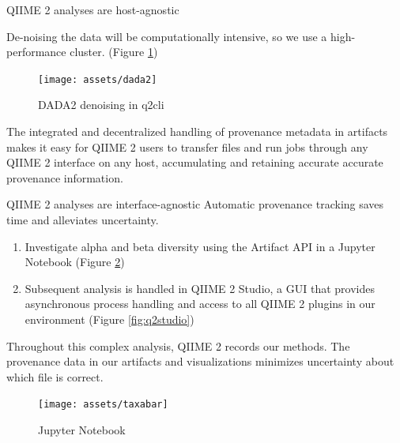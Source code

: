 \documentclass[final]{beamer}
\newlength{\colwidth}
\begin{document}
\begin{frame}[t]
\begin{columns}[t]
\begin{column}{\colwidth}
  \begin{block}{QIIME 2 analyses are host-agnostic}

    De-noising the data will be computationally intensive, so we use a
    high-performance cluster. (Figure \ref{fig:dada2})

    \begin{figure}[tph!]
      {\texttt{[image: assets/dada2]}}
      \caption{DADA2 denoising in q2cli}
      \label{fig:dada2}
    \end{figure}

    \begin{tcolorbox}
    [width=\textwidth, colframe=blue]
    {The integrated and decentralized handling of provenance metadata in
    artifacts makes it easy for QIIME 2 users to transfer files and run jobs
    through any QIIME 2 interface on any host, accumulating and retaining
    accurate accurate provenance information}.
  \end{tcolorbox}

  \end{block}

  \begin{block}{QIIME 2 analyses are interface-agnostic}
    Automatic provenance tracking saves time and alleviates uncertainty.

    \begin{enumerate}
      \item Investigate alpha and beta diversity using the Artifact API in
      a Jupyter Notebook \cite{PER-GRA:2007} (Figure \ref{fig:taxabar})
      \item Subsequent analysis is handled in QIIME 2 Studio, a GUI
      that provides asynchronous process handling and access to all
      QIIME 2 plugins in our environment (Figure \ref{fig:q2studio})
    \end{enumerate}

    \begin{tcolorbox}
    [width=\textwidth, colframe=blue]
    {Throughout this complex analysis, QIIME 2 records our methods.
    The provenance data in our artifacts and visualizations minimizes
    uncertainty about which file is correct}.
    \end{tcolorbox}

    \begin{figure}[tph!]
      {\texttt{[image: assets/taxabar]}}
      \caption{Jupyter Notebook}
      \label{fig:taxabar}
    \end{figure}

  \end{block}


\end{column}
\end{columns}
\end{frame}
\end{document}
